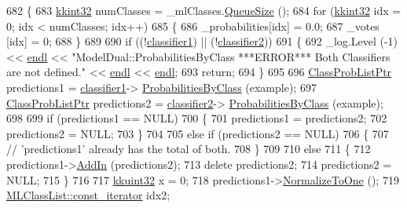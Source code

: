 \begin{DoxyCode}
682 \{
683   \hyperlink{namespace_k_k_b_a8fa4952cc84fda1de4bec1fbdd8d5b1b}{kkint32}  numClasses = \_mlClasses.\hyperlink{class_k_k_b_1_1_k_k_queue_a1dab601f75ee6a65d97f02bddf71c40d}{QueueSize} ();
684   \textcolor{keywordflow}{for}  (\hyperlink{namespace_k_k_b_a8fa4952cc84fda1de4bec1fbdd8d5b1b}{kkint32} idx = 0;  idx < numClasses;  idx++)
685   \{
686     \_probabilities[idx] = 0.0;
687     \_votes        [idx] = 0;
688   \}
689 
690   \textcolor{keywordflow}{if}  ((!\hyperlink{class_k_k_m_l_l_1_1_model_dual_a702b5e302cc05ab6cdc3ee4ae8115622}{classifier1})  ||  (!\hyperlink{class_k_k_m_l_l_1_1_model_dual_a18ed538fadc0cb3eebdb9175ccce22e2}{classifier2}))
691   \{
692     \_log.Level (-1) << \hyperlink{namespace_k_k_b_ad1f50f65af6adc8fa9e6f62d007818a8}{endl} << \textcolor{stringliteral}{"ModelDual::ProbabilitiesByClass   ***ERROR***      Both Classifiers are
       not defined."} << \hyperlink{namespace_k_k_b_ad1f50f65af6adc8fa9e6f62d007818a8}{endl} << \hyperlink{namespace_k_k_b_ad1f50f65af6adc8fa9e6f62d007818a8}{endl};
693     \textcolor{keywordflow}{return};
694   \}
695 
696   \hyperlink{class_k_k_m_l_l_1_1_class_prob_list}{ClassProbListPtr}  predictions1 = \hyperlink{class_k_k_m_l_l_1_1_model_dual_a702b5e302cc05ab6cdc3ee4ae8115622}{classifier1}->
      \hyperlink{class_k_k_m_l_l_1_1_classifier2_aa07fe8d55a8b09ea2d2051f5a7cdb72c}{ProbabilitiesByClass} (example);
697   \hyperlink{class_k_k_m_l_l_1_1_class_prob_list}{ClassProbListPtr}  predictions2 = \hyperlink{class_k_k_m_l_l_1_1_model_dual_a18ed538fadc0cb3eebdb9175ccce22e2}{classifier2}->
      \hyperlink{class_k_k_m_l_l_1_1_classifier2_aa07fe8d55a8b09ea2d2051f5a7cdb72c}{ProbabilitiesByClass} (example);
698 
699   \textcolor{keywordflow}{if}  (predictions1 == NULL)
700   \{
701     predictions1 = predictions2;
702     predictions2 = NULL;
703   \}
704 
705   \textcolor{keywordflow}{else} \textcolor{keywordflow}{if}  (predictions2 == NULL)
706   \{
707     \textcolor{comment}{// 'predictions1' already has the total of both.}
708   \}
709 
710   \textcolor{keywordflow}{else}
711   \{
712     predictions1->\hyperlink{class_k_k_m_l_l_1_1_class_prob_list_a98fdb0e8bfe0b2f4509065a44fe23da7}{AddIn} (predictions2);
713     \textcolor{keyword}{delete}  predictions2;
714     predictions2 = NULL;
715   \}
716 
717   \hyperlink{namespace_k_k_b_af8d832f05c54994a1cce25bd5743e19a}{kkuint32} x = 0;
718   predictions1->\hyperlink{class_k_k_m_l_l_1_1_class_prob_list_a998993b0a25ba7fd35cfa540277d0638}{NormalizeToOne} ();
719   \hyperlink{class_k_k_b_1_1_k_k_queue_aeb057c9c010446f46f57c1e355f981f1}{MLClassList::const\_iterator}  idx2;

\end{DoxyCode}

